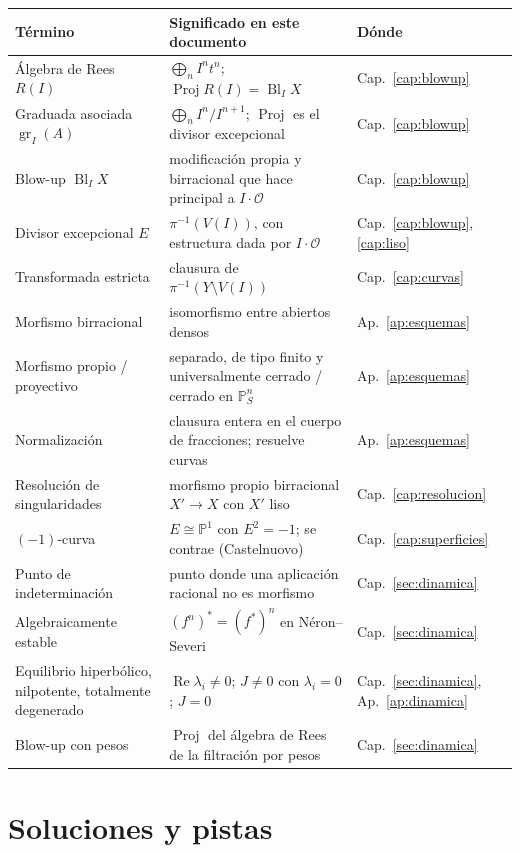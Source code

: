 \documentclass[11pt,a4paper,oneside]{book}
\newcommand{\Proj}{\operatorname{Proj}}
\newcommand{\Bl}{\operatorname{Bl}}
\newcommand{\gr}{\operatorname{gr}}
\newcommand{\PP}{\mathbb{P}}
\newcommand{\cO}{\mathcal{O}}
\theoremstyle{plain}
\theoremstyle{definition}
\theoremstyle{remark}
\begin{document}
\begin{center}
\begin{tabular}{@{}p{4.0cm}p{6.6cm}p{1.8cm}@{}}
\toprule
Término & Significado en este documento & Dónde \\
\midrule
Álgebra de Rees $R(I)$ & $\bigoplus_nI^nt^n$; $\Proj R(I)=\Bl_IX$ & Cap.~\ref{cap:blowup} \\
Graduada asociada $\gr_I(A)$ & $\bigoplus_nI^n/I^{n+1}$; $\Proj$ es el divisor excepcional & Cap.~\ref{cap:blowup} \\
Blow-up $\Bl_IX$ & modificación propia y birracional que hace principal a $I\cdot\cO$ & Cap.~\ref{cap:blowup} \\
Divisor excepcional $E$ & $\pi^{-1}(V(I))$, con estructura dada por $I\cdot\cO$ & Cap.~\ref{cap:blowup}, \ref{cap:liso} \\
Transformada estricta & clausura de $\pi^{-1}(Y\setminus V(I))$ & Cap.~\ref{cap:curvas} \\
Morfismo birracional & isomorfismo entre abiertos densos & Ap.~\ref{ap:esquemas} \\
Morfismo propio / proyectivo & separado, de tipo finito y universalmente cerrado / cerrado en $\PP^n_S$ & Ap.~\ref{ap:esquemas} \\
Normalización & clausura entera en el cuerpo de fracciones; resuelve curvas & Ap.~\ref{ap:esquemas} \\
Resolución de singularidades & morfismo propio birracional $X'\to X$ con $X'$ liso & Cap.~\ref{cap:resolucion} \\
$(-1)$-curva & $E\cong\PP^1$ con $E^2=-1$; se contrae (Castelnuovo) & Cap.~\ref{cap:superficies} \\
Punto de indeterminación & punto donde una aplicación racional no es morfismo & Cap.~\ref{sec:dinamica} \\
Algebraicamente estable & $(f^n)^*=(f^*)^n$ en Néron--Severi & Cap.~\ref{sec:dinamica} \\
Equilibrio hiperbólico, nilpotente, totalmente degenerado & $\operatorname{Re}\lambda_i\ne0$; $J\ne0$ con $\lambda_i=0$; $J=0$ & Cap.~\ref{sec:dinamica}, Ap.~\ref{ap:dinamica} \\
Blow-up con pesos & $\Proj$ del álgebra de Rees de la filtración por pesos & Cap.~\ref{sec:dinamica} \\
\bottomrule
\end{tabular}
\end{center}

\chapter{Soluciones y pistas}\label{ap:soluciones}
\end{document}
